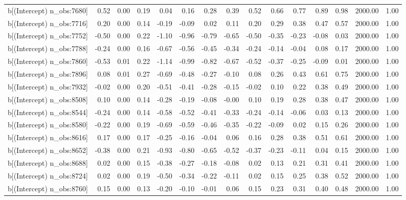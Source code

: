 \begin{table}[ht]
\begin{tabular}{rrrrrrrrrrrrrrr}
  b[(Intercept) n\_obs:7680] & 0.52 & 0.00 & 0.19 & 0.04 & 0.16 & 0.28 & 0.39 & 0.52 & 0.66 & 0.77 & 0.89 & 0.98 & 2000.00 & 1.00 \\ 
  b[(Intercept) n\_obs:7716] & 0.20 & 0.00 & 0.14 & -0.19 & -0.09 & 0.02 & 0.11 & 0.20 & 0.29 & 0.38 & 0.47 & 0.57 & 2000.00 & 1.00 \\ 
  b[(Intercept) n\_obs:7752] & -0.50 & 0.00 & 0.22 & -1.10 & -0.96 & -0.79 & -0.65 & -0.50 & -0.35 & -0.23 & -0.08 & 0.03 & 2000.00 & 1.00 \\ 
  b[(Intercept) n\_obs:7788] & -0.24 & 0.00 & 0.16 & -0.67 & -0.56 & -0.45 & -0.34 & -0.24 & -0.14 & -0.04 & 0.08 & 0.17 & 2000.00 & 1.00 \\ 
  b[(Intercept) n\_obs:7860] & -0.53 & 0.01 & 0.22 & -1.14 & -0.99 & -0.82 & -0.67 & -0.52 & -0.37 & -0.25 & -0.09 & 0.01 & 2000.00 & 1.00 \\ 
  b[(Intercept) n\_obs:7896] & 0.08 & 0.01 & 0.27 & -0.69 & -0.48 & -0.27 & -0.10 & 0.08 & 0.26 & 0.43 & 0.61 & 0.75 & 2000.00 & 1.00 \\ 
  b[(Intercept) n\_obs:7932] & -0.02 & 0.00 & 0.20 & -0.51 & -0.41 & -0.28 & -0.15 & -0.02 & 0.10 & 0.22 & 0.38 & 0.49 & 2000.00 & 1.00 \\ 
  b[(Intercept) n\_obs:8508] & 0.10 & 0.00 & 0.14 & -0.28 & -0.19 & -0.08 & -0.00 & 0.10 & 0.19 & 0.28 & 0.38 & 0.47 & 2000.00 & 1.00 \\ 
  b[(Intercept) n\_obs:8544] & -0.24 & 0.00 & 0.14 & -0.58 & -0.52 & -0.41 & -0.33 & -0.24 & -0.14 & -0.06 & 0.03 & 0.13 & 2000.00 & 1.00 \\ 
  b[(Intercept) n\_obs:8580] & -0.22 & 0.00 & 0.19 & -0.69 & -0.59 & -0.46 & -0.35 & -0.22 & -0.09 & 0.02 & 0.15 & 0.26 & 2000.00 & 1.00 \\ 
  b[(Intercept) n\_obs:8616] & 0.17 & 0.00 & 0.17 & -0.25 & -0.16 & -0.04 & 0.06 & 0.16 & 0.28 & 0.38 & 0.51 & 0.61 & 2000.00 & 1.00 \\ 
  b[(Intercept) n\_obs:8652] & -0.38 & 0.00 & 0.21 & -0.93 & -0.80 & -0.65 & -0.52 & -0.37 & -0.23 & -0.11 & 0.04 & 0.15 & 2000.00 & 1.00 \\ 
  b[(Intercept) n\_obs:8688] & 0.02 & 0.00 & 0.15 & -0.38 & -0.27 & -0.18 & -0.08 & 0.02 & 0.13 & 0.21 & 0.31 & 0.41 & 2000.00 & 1.00 \\ 
  b[(Intercept) n\_obs:8724] & 0.02 & 0.00 & 0.19 & -0.50 & -0.34 & -0.22 & -0.11 & 0.02 & 0.15 & 0.25 & 0.38 & 0.52 & 2000.00 & 1.00 \\ 
  b[(Intercept) n\_obs:8760] & 0.15 & 0.00 & 0.13 & -0.20 & -0.10 & -0.01 & 0.06 & 0.15 & 0.23 & 0.31 & 0.40 & 0.48 & 2000.00 & 1.00 \\ 

\end{tabular}
\end{table}
